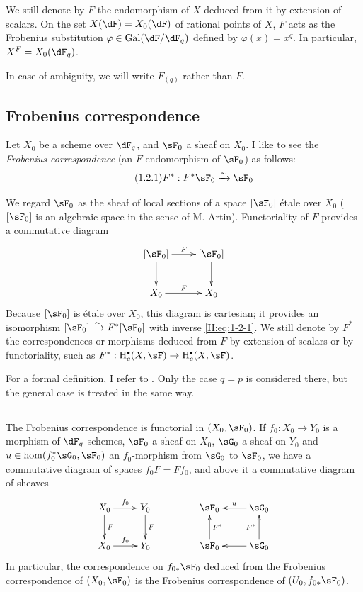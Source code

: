 We still denote by $F$ the endomorphism of $X$ deduced from it by
extension of scalars. On the set $X(\dF) = X_0(\dF)$ of
rational points of $X$, $F$ acts as the Frobenius substitution
$\varphi\in\gal(\dF/\dF_q)$ defined by $\varphi(x)=x^q$. In particular,
$X^F=X_0(\dF_q)$.

In case of ambiguity, we will write $F_{(q)}$ rather than $F$.








\subsection{Frobenius correspondence}\label{II:1-2}

Let $X_0$ be a scheme over $\dF_q$, and $\sF_0$ a sheaf on $X_0$. I like
to see the \emph{Frobenius correspondence} (an $F$-endomorphism of
$\sF_0$) as follows:
\begin{equation*}\tag{1.2.1}\label{II:eq:1-2-1}
  F^* : F^*\sF_0 \iso \sF_0
\end{equation*}

We regard $\sF_0$ as the sheaf of local sections of a space
$[\sF_0]$ \'etale over $X_0$ ($[\sF_0]$ is an algebraic space in the sense of M.
Artin). Functoriality of $F$ provides a commutative diagram
\[\xymatrix{
  [\sF_0] \ar[r]^-F \ar[d]
    & [\sF_0] \ar[d] \\
  X_0 \ar[r]^F
    & X_0
}\]
Because $[\sF_0]$ is \'etale over $X_0$, this diagram is cartesian; it provides
an isomorphism $[\sF_0]\iso F^*[\sF_0]$ with inverse \eqref{II:eq:1-2-1}. We still
denote by $F^*$ the correspondences or morphisms deduced from $F$ by extension
of scalars or by functoriality, such as
$F^*:\h_c^\bullet(X,\sF)\to \h_c^\bullet(X,\sF)$.

For a formal definition, I refer to \cite[XI.1,2]{sga5}. Only
the case $q=p$ is considered there, but the general case is treated in the same way.




\subsection{}\label{II:1-3}

The Frobenius correspondence is functorial in $(X_0,\sF_0)$. If
$f_0:X_0\to Y_0$ is a morphism of $\dF_q$-schemes, $\sF_0$ a sheaf on
$X_0$, $\sG_0$ a sheaf on $Y_0$ and $u\in\hom(f_0^*\sG_0,\sF_0)$ an
$f_0$-morphism from $\sG_0$ to $\sF_0$, we have a commutative diagram of spaces
$f_0 F = F f_0$, and above it a commutative diagram of sheaves
\[\xymatrix{
  X_0 \ar[r]^-{f_0} \ar[d]^-F
    & Y_0 \ar[d]^-F \\
  X_0 \ar[r]^-{f_0}
    & Y_0
}\qquad\qquad
\xymatrix{
  \sF_0
    & \ar[l]_-u \sG_0 \\
  \sF_0 \ar[u]_-{F^*}
    & \ar[l] \sG_0 \ar[u]^-{F^*}
}\]
In particular, the correspondence on $f_{0*}\sF_0$ deduced from the Frobenius
correspondence of $(X_0,\sF_0)$ is the Frobenius correspondence of
$(U_0,f_{0*}\sF_0)$.




